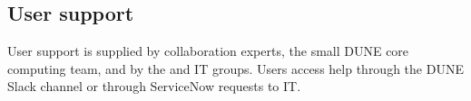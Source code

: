 \documentclass[../main-v1.tex]{subfiles}
\begin{document}
\subsection{User support}
User support is supplied by collaboration experts, the small DUNE core computing team, and by the  and  IT groups. 
Users access help through the DUNE Slack channel or through ServiceNow requests to  IT. 





\pagebreak






\end{document}
